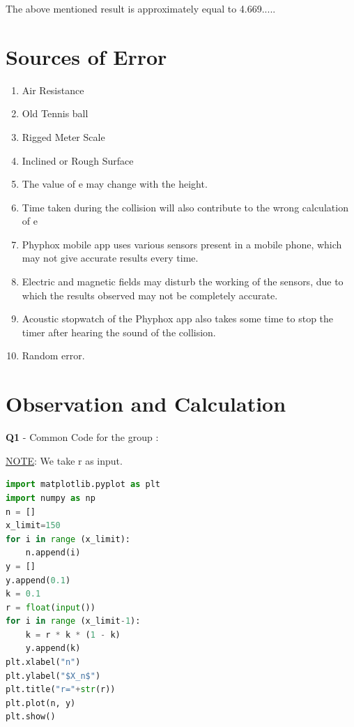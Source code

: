\documentclass[11pt]{scrartcl} %
\begin{document}
The above mentioned result is approximately equal to 4.669.....
\section{Sources of Error}
\begin{enumerate}
	\item Air Resistance
	\item Old Tennis ball
	\item Rigged Meter Scale
	\item Inclined or Rough Surface
	\item The value of e may change with the height.
	\item Time taken during the collision will also contribute to the wrong calculation of e
	\item Phyphox mobile app uses various sensors present in a mobile phone, which may not give accurate results every time.
	\item Electric and magnetic fields may disturb the working of the sensors, due to which the results observed may not be completely accurate.
	\item Acoustic stopwatch of the Phyphox app also takes some time to stop the timer after hearing the sound of the collision.
	\item Random error.
\end{enumerate}
\newpage

\section{Observation and Calculation}
\textbf{Q1} - Common Code for the group :\par
\underline{NOTE}: We take r as input.\par
\begin{lstlisting}[language=Python, caption= Code for plotting $X_n$ vs n graph for a given r]
import matplotlib.pyplot as plt
import numpy as np
n = []
x_limit=150
for i in range (x_limit):
    n.append(i)
y = []
y.append(0.1)
k = 0.1
r = float(input())
for i in range (x_limit-1):
    k = r * k * (1 - k)
    y.append(k)
plt.xlabel("n")
plt.ylabel("$X_n$")
plt.title("r="+str(r))
plt.plot(n, y)
plt.show() 
\end{lstlisting}
\newpage
\end{document}
